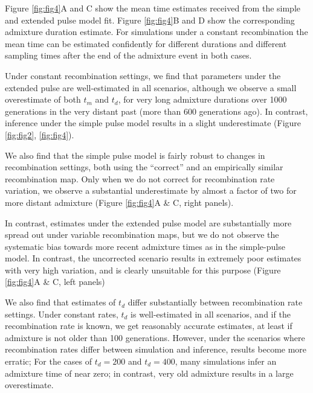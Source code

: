\documentclass[]{article}
\begin{document}
Figure \ref{fig:fig4}A and C show the mean
time estimates received from the simple and extended pulse model fit. Figure \ref{fig:fig4}B and D show the corresponding admixture duration estimate. For simulations under a
constant recombination the mean time can be estimated confidently for different durations and different sampling times after the end of the admixture event in both cases. 

Under constant recombination settings, we find that parameters under the extended pulse are well-estimated in all scenarios, although we observe a small overestimate of both $t_m$ and $t_d$, for very long admixture durations over 1000 generations in the very distant past (more than 600 generations ago). In contrast, inference under the simple pulse model results in a slight underestimate (Figure \ref{fig:fig2}, \ref{fig:fig4}).

We also find that the simple pulse model is fairly robust to changes in recombination settings, both using the ``correct'' and an empirically similar recombination map. Only when we do not correct for recombination rate variation, we observe a substantial underestimate by almost a factor of two for more distant admixture (Figure \ref{fig:fig4}A \& C, right panels). 

In contrast, estimates under the extended pulse model are substantially more spread out under variable recombination maps, but we do not observe the systematic bias towards more recent admixture times as in the simple-pulse model. In contrast, the uncorrected scenario results in extremely poor estimates with very high variation, and is clearly unsuitable for this purpose (Figure \ref{fig:fig4}A \& C, left panels)

We also find that estimates of $t_d$ differ substantially between recombination rate settings. Under constant rates, $t_d$ is well-estimated in all scenarios, and if the recombination rate is known, we get reasonably accurate estimates, at least if admixture is not older than 100 generations. However, under the scenarios where recombination rates differ between simulation and inference, results become more erratic; For the cases of $t_d=200$ and $t_d=400$, many simulations infer an admixture time of near zero; in contrast, very old admixture results in a large overestimate.
\end{document}
